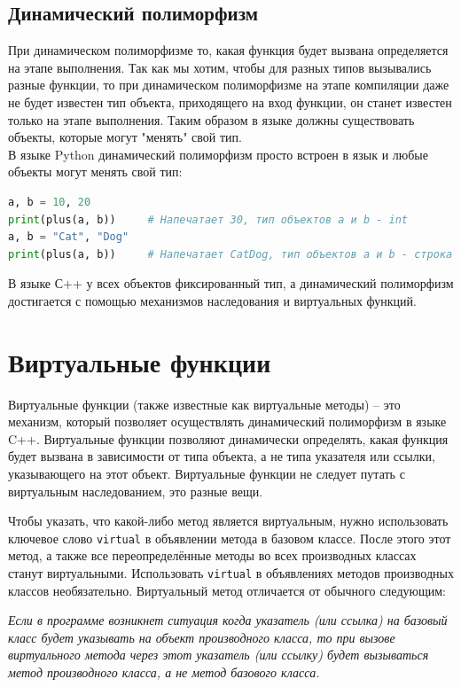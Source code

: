 \documentclass{article}
\begin{document}
\subsection*{Динамический полиморфизм}
При динамическом полиморфизме то, какая функция будет вызвана определяется на этапе выполнения. Так как мы хотим, чтобы для разных типов вызывались разные функции, то при динамическом полиморфизме на этапе компиляции даже не будет известен тип объекта, приходящего на вход функции, он станет известен только на этапе выполнения. Таким образом в языке должны существовать объекты, которые могут "менять"{} свой тип.\\
В языке Python динамический полиморфизм просто встроен в язык и любые объекты могут менять свой тип:
\begin{lstlisting}[language=Python]
a, b = 10, 20
print(plus(a, b))     # Напечатает 30, тип объектов a и b - int
a, b = "Cat", "Dog"
print(plus(a, b))     # Напечатает CatDog, тип объектов a и b - строка
\end{lstlisting}
В языке С++ у всех объектов фиксированный тип, а динамический полиморфизм достигается с помощью механизмов наследования и виртуальных функций.

\newpage
\section{Виртуальные функции}
Виртуальные функции (также известные как виртуальные методы) -- это механизм, который позволяет осуществлять динамический полиморфизм в языке C++.
Виртуальные функции позволяют динамически определять, какая функция будет вызвана в зависимости от типа объекта, а не типа указателя или ссылки, указывающего на этот объект.
Виртуальные функции не следует путать с виртуальным наследованием, это разные вещи.

Чтобы указать, что какой-либо метод является виртуальным, нужно использовать ключевое слово \texttt{virtual} в объявлении метода в базовом классе. После этого этот метод, а также все переопределённые методы во всех производных классах станут виртуальными. Использовать \texttt{virtual} в объявлениях методов производных классов необязательно. Виртуальный метод отличается от обычного следующим:

\begin{center}
\textit{Если в программе возникнет ситуация когда указатель (или ссылка) на базовый класс будет указывать на объект производного класса, то при вызове виртуального метода через этот указатель (или ссылку) будет вызываться метод производного класса, а не метод базового класса.}
\end{center}
\end{document}
